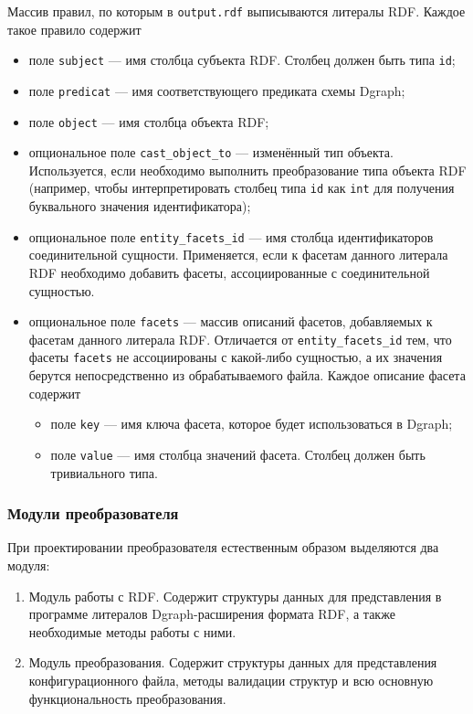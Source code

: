 Массив правил, по которым в \texttt{output.rdf} выписываются литералы RDF. Каждое такое правило содержит
\begin{itemize}
    \item поле \texttt{subject} --- имя столбца субъекта RDF. Столбец должен быть типа \texttt{id};
    \item поле \texttt{predicat} --- имя соответствующего предиката схемы Dgraph;
    \item поле \texttt{object} --- имя столбца объекта RDF;
    \item опциональное поле \texttt{cast\_object\_to} --- изменённый тип объекта. Используется, если
необходимо выполнить преобразование типа объекта RDF (например, чтобы интерпретировать столбец типа \texttt{id}
как \texttt{int} для получения буквального значения идентификатора);
    \item опциональное поле \texttt{entity\_facets\_id} --- имя столбца идентификаторов
соединительной сущности. Применяется, если к фасетам данного литерала RDF необходимо добавить
фасеты, ассоциированные с соединительной сущностью.
    \item опциональное поле \texttt{facets} --- массив описаний фасетов, добавляемых к фасетам
данного литерала RDF. Отличается от \texttt{entity\_facets\_id} тем, что фасеты \texttt{facets}
не ассоциированы с какой-либо сущностью, а их значения берутся непосредственно из обрабатываемого
файла. Каждое описание фасета содержит
\begin{itemize}
    \item поле \texttt{key} --- имя ключа фасета, которое будет использоваться в Dgraph;
    \item поле \texttt{value} --- имя столбца значений фасета. Столбец должен быть тривиального
типа.
\end{itemize}
\end{itemize}


\subsubsection{Модули преобразователя}

При проектировании преобразователя естественным образом выделяются два модуля:
\begin{enumerate}
    \item Модуль работы с RDF. Содержит структуры данных для представления в программе литералов
Dgraph-расширения формата RDF, а также необходимые методы работы с ними.
    \item Модуль преобразования. Содержит структуры данных для представления конфигурационного
файла, методы валидации структур и всю основную функциональность преобразования.
\end{enumerate}

